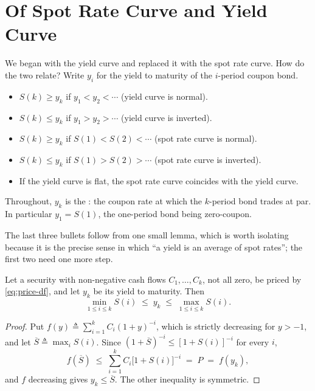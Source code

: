 \section{Of Spot Rate Curve and Yield Curve}
\label{sec:spot-vs-yield}


We began with the yield curve and replaced it with the spot rate curve.
How do the two relate? Write $y_{i}$ for the yield to maturity of the $i$-period coupon bond.

\begin{itemize}[nosep]
	\item $S(k)\ge y_{k}$ if $y_{1}<y_{2}<\cdots$ (yield curve is normal).
	\item $S(k)\le y_{k}$ if $y_{1}>y_{2}>\cdots$ (yield curve is inverted).
	\item $S(k)\ge y_{k}$ if $S(1)<S(2)<\cdots$ (spot rate curve is normal).
	\item $S(k)\le y_{k}$ if $S(1)>S(2)>\cdots$ (spot rate curve is inverted).
	\item If the yield curve is flat, the spot rate curve coincides with the yield curve.
\end{itemize}

\suppstart
Throughout, $y_{k}$ is the : the coupon rate at which the $k$-period bond trades at par.
In particular $y_{1}=S(1)$, the one-period bond being zero-coupon.

The last three bullets follow from one small lemma, which is worth isolating because it is the precise sense in which ``a yield is an average of spot rates''; the first two need one more step.

\begin{lemma}
	\label{lem:yield-avg}
	Let a security with non-negative cash flows $C_{1},\ldots,C_{k}$, not all zero, be priced by \eqref{eq:price-df}, and let $y_{k}$ be its yield to maturity.
	Then
	\[
		\min_{1\le i\le k} S(i) \;\le\; y_{k} \;\le\; \max_{1\le i\le k} S(i) .
	\]
\end{lemma}

\begin{proof}
	Put $f(y) \triangleq \sum_{i=1}^{k}C_{i}(1+y)^{-i}$, which is strictly decreasing for $y>-1$, and let $\overline{S}\triangleq\max_{i}S(i)$.
	Since $(1+\overline{S})^{-i}\le[1+S(i)]^{-i}$ for every $i$,
	\[
		f(\overline{S}) \;\le\; \sum_{i=1}^{k}C_{i}\bigl[1+S(i)\bigr]^{-i} \;=\; P \;=\; f(y_{k}) ,
	\]
	and $f$ decreasing gives $y_{k}\le\overline{S}$.
	The other inequality is symmetric.
\end{proof}

